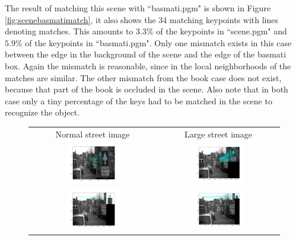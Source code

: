 \documentclass[11pt,a4paper]{article}
\begin{document}
The result of matching this scene with ``basmati.pgm" is shown in Figure \ref{fig:scenebasmatimatch}, it also shows the 34 matching keypoints with lines denoting matches.
This amounts to $3.3\%$ of the keypoints in ``scene.pgm" and $5.9\%$ of the keypoints in ``basmati.pgm".
Only one mismatch exists in this case between the edge in the background of the scene and the edge of the basmati box.
Again the mismatch is reasonable, since in the local neighborhoods of the matches are similar.
The other mismatch from the book case does not exist, because that part of the book is occluded in the scene.
Also note that in both case only a tiny percentage of the keys had to be matched in the scene to recognize the object.

\begin{figure}
\centering
\begin{tabular}{cc}
    Normal street image & Large street image \\
    \includegraphics[width=0.45\textwidth]{./img/street-d1-match.png} & \includegraphics[width=0.45\textwidth]{./img/streetlarge-d1-match.png} \\
    \includegraphics[width=0.45\textwidth]{./img/street-d2-match.png} & \includegraphics[width=0.45\textwidth]{./img/streetlarge-d2-match.png} \\

\end{tabular}
\end{figure}
\end{document}
